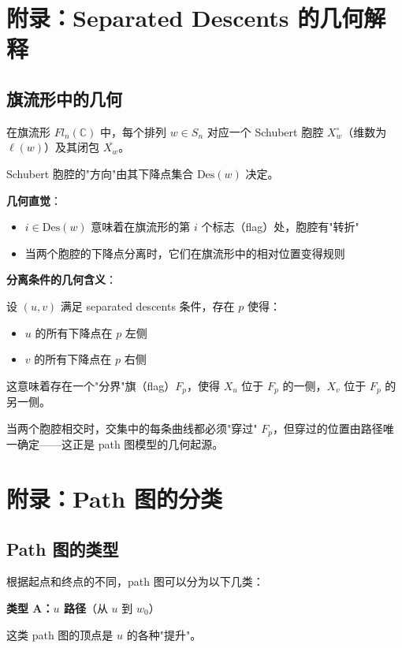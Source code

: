 \section{附录：Separated Descents 的几何解释}
\label{sec:appendix-ch2-geometry}

\subsection*{旗流形中的几何}

在旗流形 $Fl_n(\mathbb{C})$ 中，每个排列 $w \in S_n$ 对应一个 Schubert 胞腔 $X_w^\circ$（维数为 $\ell(w)$）及其闭包 $\overline{X_w}$。

Schubert 胞腔的"方向"由其下降点集合 $\mathrm{Des}(w)$ 决定。

\textbf{几何直觉}：
\begin{itemize}
\item $i \in \mathrm{Des}(w)$ 意味着在旗流形的第 $i$ 个标志（flag）处，胞腔有"转折"
\item 当两个胞腔的下降点分离时，它们在旗流形中的相对位置变得规则
\end{itemize}

\textbf{分离条件的几何含义}：

设 $(u,v)$ 满足 separated descents 条件，存在 $p$ 使得：
\begin{itemize}
\item $u$ 的所有下降点在 $p$ 左侧
\item $v$ 的所有下降点在 $p$ 右侧
\end{itemize}

这意味着存在一个"分界"旗（flag）$F_p$，使得 $X_u$ 位于 $F_p$ 的一侧，$X_v$ 位于 $F_p$ 的另一侧。

当两个胞腔相交时，交集中的每条曲线都必须"穿过" $F_p$，但穿过的位置由路径唯一确定——这正是 path 图模型的几何起源。

\section{附录：Path 图的分类}
\label{sec:appendix-ch2-path-classification}

\subsection*{Path 图的类型}

根据起点和终点的不同，path 图可以分为以下几类：

\textbf{类型 A：$u$ 路径}（从 $u$ 到 $w_0$）

这类 path 图的顶点是 $u$ 的各种"提升"。


